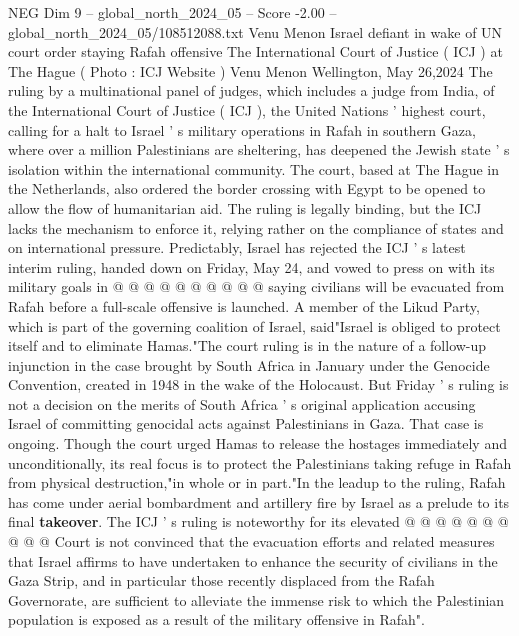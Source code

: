 \begin{textsample}{NEG Dim 9 – global\_north\_2024\_05 – Score -2.00 – global\_north\_2024\_05/108512088.txt}  \label{ex:f9_neg_160}
Venu Menon Israel defiant in wake of UN court order staying Rafah offensive The International Court of Justice ( ICJ ) at The Hague ( Photo : ICJ Website ) Venu Menon Wellington, May 26,2024 The ruling by a multinational panel of judges, which includes a judge from India, of the International Court of Justice ( ICJ ), the United Nations ' highest court, calling for a halt to Israel ' s military operations in Rafah in southern Gaza, where over a million Palestinians are sheltering, has deepened the Jewish state ' s isolation within the international community.
The court, based at The Hague in the Netherlands, also ordered the border crossing with Egypt to be opened to allow the flow of humanitarian aid.
The ruling is legally binding, but the ICJ lacks the mechanism to enforce it, relying rather on the compliance of states and on international pressure.
Predictably, Israel has rejected the ICJ ' s latest interim ruling, handed down on Friday, May 24, and vowed to press on with its military goals in @ @ @ @ @ @ @ @ @ @ saying civilians will be evacuated from Rafah before a full-scale offensive is launched.
A member of the Likud Party, which is part of the governing coalition of Israel, said"Israel is obliged to protect itself and to eliminate Hamas."The court ruling is in the nature of a follow-up injunction in the case brought by South Africa in January under the Genocide Convention, created in 1948 in the wake of the Holocaust.
But Friday ' s ruling is not a decision on the merits of South Africa ' s original application accusing Israel of committing genocidal acts against Palestinians in Gaza.
That case is ongoing.
Though the court urged Hamas to release the hostages immediately and unconditionally, its real focus is to protect the Palestinians taking refuge in Rafah from physical destruction,"in whole or in part."In the leadup to the ruling, Rafah has come under aerial bombardment and artillery fire by Israel as a prelude to its final \textbf{takeover}.
The ICJ ' s ruling is noteworthy for its elevated @ @ @ @ @ @ @ @ @ @ Court is not convinced that the evacuation efforts and related measures that Israel affirms to have undertaken to enhance the security of civilians in the Gaza Strip, and in particular those recently displaced from the Rafah Governorate, are sufficient to alleviate the immense risk to which the Palestinian population is exposed as a result of the military offensive in Rafah".

\end{textsample}
